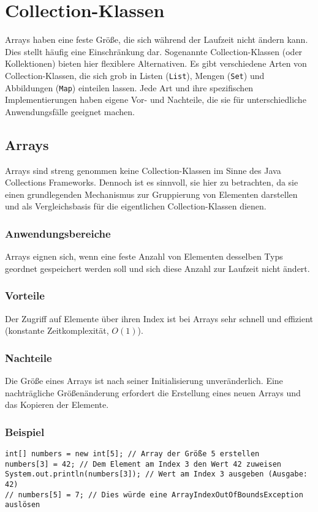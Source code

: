 \chapter{Collection-Klassen}
\label{chap:CollectionKlassen}

Arrays haben eine feste Größe, die sich während der Laufzeit nicht ändern kann. Dies stellt häufig eine Einschränkung dar. Sogenannte Collection-Klassen (oder Kollektionen) bieten hier flexiblere Alternativen. Es gibt verschiedene Arten von Collection-Klassen, die sich grob in Listen (\texttt{List}), Mengen (\texttt{Set}) und Abbildungen (\texttt{Map}) einteilen lassen. Jede Art und ihre spezifischen Implementierungen haben eigene Vor- und Nachteile, die sie für unterschiedliche Anwendungsfälle geeignet machen.

\section{Arrays}
Arrays sind streng genommen keine Collection-Klassen im Sinne des Java Collections Frameworks. Dennoch ist es sinnvoll, sie hier zu betrachten, da sie einen grundlegenden Mechanismus zur Gruppierung von Elementen darstellen und als Vergleichsbasis für die eigentlichen Collection-Klassen dienen.

\subsection{Anwendungsbereiche}
Arrays eignen sich, wenn eine feste Anzahl von Elementen desselben Typs geordnet gespeichert werden soll und sich diese Anzahl zur Laufzeit nicht ändert.

\subsection{Vorteile}
Der Zugriff auf Elemente über ihren Index ist bei Arrays sehr schnell und effizient (konstante Zeitkomplexität, $O(1)$).

\subsection{Nachteile}
Die Größe eines Arrays ist nach seiner Initialisierung unveränderlich. Eine nachträgliche Größenänderung erfordert die Erstellung eines neuen Arrays und das Kopieren der Elemente.

\subsection{Beispiel}
\begin{lstlisting}[caption={Beispiel für die Verwendung eines Arrays in Java}, label=lst:arrayExample]
int[] numbers = new int[5]; // Array der Größe 5 erstellen
numbers[3] = 42; // Dem Element am Index 3 den Wert 42 zuweisen
System.out.println(numbers[3]); // Wert am Index 3 ausgeben (Ausgabe: 42)
// numbers[5] = 7; // Dies würde eine ArrayIndexOutOfBoundsException auslösen
\end{lstlisting}

